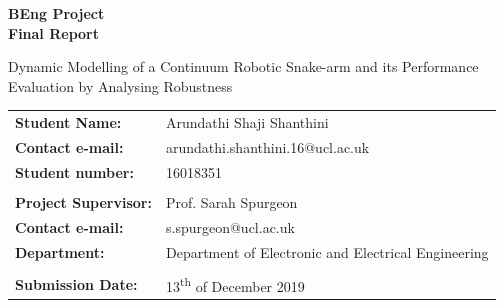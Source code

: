 \documentclass[a4paper,12pt]{report}
\author{Arundathi Shaji Shanthini}
\begin{document}
\begin{titlepage}
    \setlength{\voffset}{-1.8in}
    \noindent \noindent {}
    
    \vspace{30mm}

    \begin{center}
        {\LARGE \textbf{BEng Project}}\\
        \vspace{4mm}
        {\Huge \textbf{Final Report}}
    \end{center}
    
    \vspace{10mm}
    
    \begin{center}
    \begin{spacing}{1.8}
    {\LARGE
   Dynamic Modelling of a Continuum Robotic Snake-arm and its Performance Evaluation by Analysing Robustness}
    \end{spacing}
    \end{center}
    
   \vspace{5mm}
    
     \begin{tabular}{ll}
        \textbf{Student Name:}  & \hspace{4mm} Arundathi Shaji Shanthini \\
       \textbf{Contact e-mail:} & \hspace{4mm} arundathi.shanthini.16@ucl.ac.uk \\
        \textbf{Student number:} & \hspace{4mm} 16018351 \\ \\ 
        \textbf{Project Supervisor:}  & \hspace{4mm} Prof. Sarah Spurgeon \\
        \textbf{Contact e-mail:}  & \hspace{4mm} s.spurgeon@ucl.ac.uk \\
         \textbf{Department:} & \hspace{4mm} Department of Electronic and Electrical Engineering\\ \\ 
          \textbf{Submission Date:} & \hspace{4mm} 13\textsuperscript{th} of December 2019
    \end{tabular}
\end{titlepage}
\end{document}
